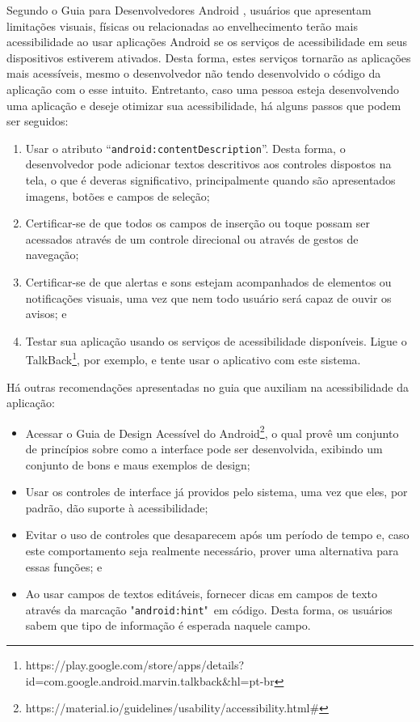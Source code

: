 Segundo o Guia para Desenvolvedores Android \cite{DEVACCESS2016}, usuários que apresentam limitações visuais, físicas ou relacionadas ao envelhecimento terão mais acessibilidade ao usar aplicações Android se os serviços de acessibilidade em seus dispositivos estiverem ativados. Desta forma, estes serviços tornarão as aplicações mais acessíveis, mesmo o desenvolvedor não tendo desenvolvido o código da aplicação com o esse intuito. Entretanto, caso uma pessoa esteja desenvolvendo uma aplicação e deseje otimizar sua acessibilidade, há alguns passos que podem ser seguidos:
\begin{enumerate}
	\item Usar o atributo “\texttt{android:contentDescription}”. Desta forma, o desenvolvedor pode adicionar textos descritivos aos controles dispostos na tela, o que é deveras significativo, principalmente quando são apresentados imagens, botões e campos de seleção;
	\item Certificar-se de que todos os campos de inserção ou toque possam ser acessados através de um controle direcional ou através de gestos de navegação;
	\item Certificar-se de que alertas e sons estejam acompanhados de elementos ou notificações visuais, uma vez que nem todo usuário será capaz de ouvir os avisos; e
	\item Testar sua aplicação usando os serviços de acessibilidade disponíveis. Ligue o TalkBack\footnote{https://play.google.com/store/apps/details?id=com.google.android.marvin.talkback\&hl=pt-br}, por exemplo, e tente usar o aplicativo com este sistema.
\end{enumerate}

Há outras recomendações apresentadas no guia que auxiliam na acessibilidade da aplicação:
\begin{itemize}
	\item Acessar o Guia de Design Acessível do Android\footnote{https://material.io/guidelines/usability/accessibility.html\#}, o qual provê um conjunto de princípios sobre como a interface pode ser desenvolvida, exibindo um conjunto de bons e maus exemplos de design;
	\item Usar os controles de interface já providos pelo sistema, uma vez que eles, por padrão, dão suporte à acessibilidade;
	\item Evitar o uso de controles que desaparecem após um período de tempo e, caso este comportamento seja realmente necessário, prover uma alternativa para essas funções; e
	\item Ao usar campos de textos editáveis, fornecer dicas em campos de texto através da marcação "\texttt{android:hint}"\ em código. Desta forma, os usuários sabem que tipo de informação é esperada naquele campo.
\end{itemize}

